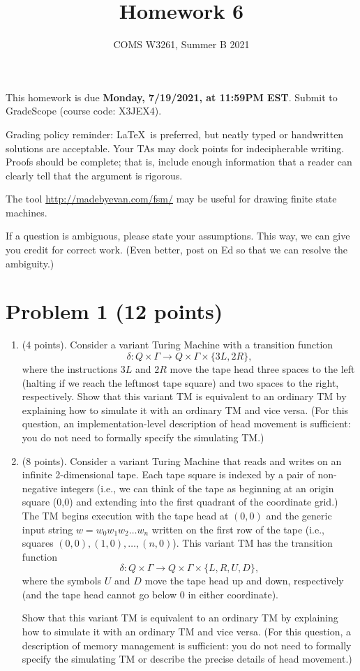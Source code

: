 \documentclass[letterpaper,11pt,twoside]{article}
\title{Homework 6}
\date{COMS W3261, Summer B 2021}
\theoremstyle{plain}
\theoremstyle{definition}
\theoremstyle{remark}
\theoremstyle{restate}
\begin{document}
\maketitle

This homework is due \textbf{Monday, 7/19/2021, at 11:59PM EST}. Submit to GradeScope (course code: X3JEX4).

Grading policy reminder: \LaTeX~is preferred, but neatly typed or handwritten solutions are acceptable. Your TAs may dock points for indecipherable writing. Proofs should be complete; that is, include enough information that a reader can clearly tell that the argument is rigorous.

The tool \url{http://madebyevan.com/fsm/} may be useful for drawing finite state machines.

If a question is ambiguous, please state your assumptions. This way, we can give you credit for correct work. (Even better, post on Ed so that we can resolve the ambiguity.)

\clearpage
\section{Problem 1 (12 points)}

\begin{enumerate}
    \item (4 points). Consider a variant Turing Machine with a transition function
    \[
        \delta : Q \times \Gamma \rightarrow Q \times \Gamma \times \{3L, 2R\},
    \]
    where the instructions $3L$ and $2R$ move the tape head three spaces to the left (halting if we reach the leftmost tape square) and two spaces to the right, respectively. Show that this variant TM is equivalent to an ordinary TM by explaining how to simulate it with an ordinary TM and vice versa. (For this question, an implementation-level description of head movement is sufficient: you do not need to formally specify the simulating TM.)

    \item (8 points). Consider a variant Turing Machine that reads and writes on an infinite 2-dimensional tape. Each tape square is indexed by a pair of non-negative integers (i.e., we can think of the tape as beginning at an origin square (0,0) and extending into the first quadrant of the coordinate grid.) The TM begins execution with the tape head at $(0,0)$ and the  generic input string $w = w_0w_1w_2\dots w_n$ written on the first row of the tape (i.e., squares $(0,0), (1,0), \dots, (n,0)$). This variant TM has the transition function
    \[
        \delta : Q \times \Gamma \rightarrow Q \times \Gamma \times \{L, R, U, D\},
    \]
    where the symbols $U$ and $D$ move the tape head up and down, respectively (and the tape head cannot go below 0 in either coordinate).
    
    Show that this variant TM is equivalent to an ordinary TM by explaining how to simulate it with an ordinary TM and vice versa.  (For this question, a description of memory management is sufficient: you do not need to formally specify the simulating TM or describe the precise details of head movement.)
\end{enumerate}
\end{document}
